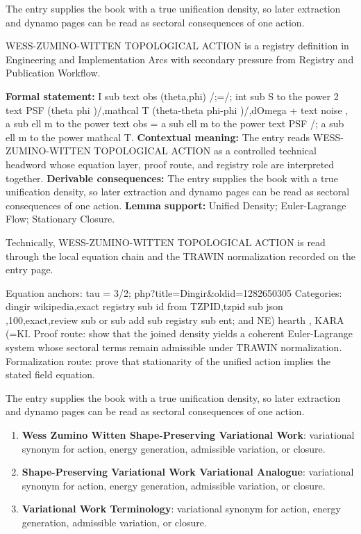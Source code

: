 The entry supplies the book with a true unification density, so later extraction and dynamo pages can be read as sectoral consequences of one action.
\clearpage


\begingroup\small
{}
WESS-ZUMINO-WITTEN TOPOLOGICAL ACTION is a registry definition in Engineering and Implementation Arcs with secondary pressure from Registry and Publication Workflow.

\begingroup\footnotesize\setlength{\emergencystretch}{3em}\sloppy
\textbf{Formal statement:} I sub text obs (theta,phi) /;=/; int sub S to the power 2 text PSF (theta phi )/,mathcal T (theta-theta phi-phi )/,dOmega + text noise , a sub ell m to the power text obs = a sub ell m to the power text PSF /; a sub ell m to the power mathcal T. \textbf{Contextual meaning:} The entry reads WESS-ZUMINO-WITTEN TOPOLOGICAL ACTION as a controlled technical headword whose equation layer, proof route, and registry role are interpreted together. \textbf{Derivable consequences:} The entry supplies the book with a true unification density, so later extraction and dynamo pages can be read as sectoral consequences of one action. \textbf{Lemma support:} Unified Density; Euler-Lagrange Flow; Stationary Closure.\par
\endgroup

Technically, WESS-ZUMINO-WITTEN TOPOLOGICAL ACTION is read through the local equation chain and the TRAWIN normalization recorded on the entry page.

Equation anchors: tau = 3/2; php?title=Dingir\&oldid=1282650305 Categories: dingir wikipedia,exact registry sub id from TZPID,tzpid sub json ,100,exact,review sub or sub add sub registry sub ent; and NE) hearth , KARA  (=KI. Proof route: show that the joined density yields a coherent Euler-Lagrange system whose sectoral terms remain admissible under TRAWIN normalization. Formalization route: prove that stationarity of the unified action implies the stated field equation.

The entry supplies the book with a true unification density, so later extraction and dynamo pages can be read as sectoral consequences of one action.
\endgroup

\begin{enumerate}[leftmargin=1.6em,itemsep=6pt,topsep=4pt]
\item \textbf{Wess Zumino Witten Shape-Preserving Variational Work}: variational synonym for action, energy generation, admissible variation, or closure.
\item \textbf{Shape-Preserving Variational Work Variational Analogue}: variational synonym for action, energy generation, admissible variation, or closure.
\item \textbf{Variational Work Terminology}: variational synonym for action, energy generation, admissible variation, or closure.
\end{enumerate}

